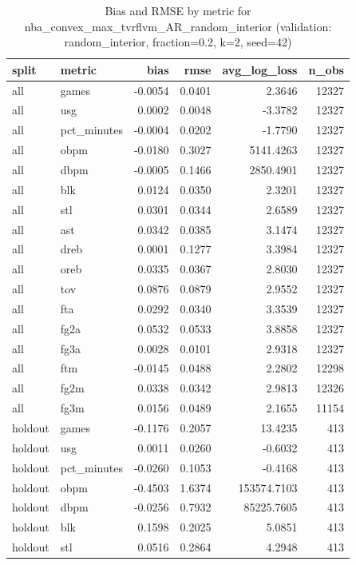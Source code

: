 \begin{table}
\caption{Bias and RMSE by metric for nba_convex_max_tvrflvm_AR_random_interior (validation: random_interior, fraction=0.2, k=2, seed=42)}
\label{tab:nba_convex_max_tvrflvm_AR_random_interior_vs_random_interior_f20_k2_s42_bias_rmse}
\begin{tabular}{llrrrr}
\toprule
split & metric & bias & rmse & avg\_log\_loss & n\_obs \\
\midrule
all & games & -0.0054 & 0.0401 & 2.3646 & 12327 \\
all & usg & 0.0002 & 0.0048 & -3.3782 & 12327 \\
all & pct\_minutes & -0.0004 & 0.0202 & -1.7790 & 12327 \\
all & obpm & -0.0180 & 0.3027 & 5141.4263 & 12327 \\
all & dbpm & -0.0005 & 0.1466 & 2850.4901 & 12327 \\
all & blk & 0.0124 & 0.0350 & 2.3201 & 12327 \\
all & stl & 0.0301 & 0.0344 & 2.6589 & 12327 \\
all & ast & 0.0342 & 0.0385 & 3.1474 & 12327 \\
all & dreb & 0.0001 & 0.1277 & 3.3984 & 12327 \\
all & oreb & 0.0335 & 0.0367 & 2.8030 & 12327 \\
all & tov & 0.0876 & 0.0879 & 2.9552 & 12327 \\
all & fta & 0.0292 & 0.0340 & 3.3539 & 12327 \\
all & fg2a & 0.0532 & 0.0533 & 3.8858 & 12327 \\
all & fg3a & 0.0028 & 0.0101 & 2.9318 & 12327 \\
all & ftm & -0.0145 & 0.0488 & 2.2802 & 12298 \\
all & fg2m & 0.0338 & 0.0342 & 2.9813 & 12326 \\
all & fg3m & 0.0156 & 0.0489 & 2.1655 & 11154 \\
holdout & games & -0.1176 & 0.2057 & 13.4235 & 413 \\
holdout & usg & 0.0011 & 0.0260 & -0.6032 & 413 \\
holdout & pct\_minutes & -0.0260 & 0.1053 & -0.4168 & 413 \\
holdout & obpm & -0.4503 & 1.6374 & 153574.7103 & 413 \\
holdout & dbpm & -0.0256 & 0.7932 & 85225.7605 & 413 \\
holdout & blk & 0.1598 & 0.2025 & 5.0851 & 413 \\
holdout & stl & 0.0516 & 0.2864 & 4.2948 & 413 \\

\end{tabular}
\end{table}
